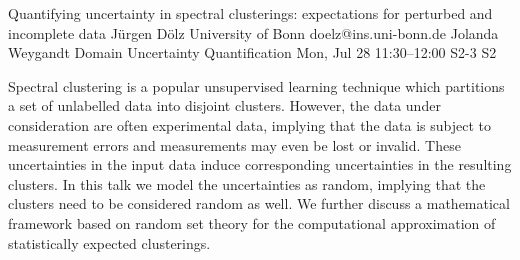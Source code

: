 \begin{talk}
\end{talk}

\begin{talk}
  {Quantifying uncertainty in spectral clusterings: expectations for perturbed and incomplete data}%
  {J\"urgen D\"olz}%
  {University of Bonn}%
  {doelz@ins.uni-bonn.de}%
  {Jolanda Weygandt}%
  {Domain Uncertainty Quantification}%
  {Mon, Jul 28 11:30–12:00}%
  {S2-3}%
  {S2}%
				
			
Spectral clustering is a popular unsupervised learning technique which partitions a set of unlabelled data into disjoint clusters. However, the data under consideration are often experimental data, implying that the data is subject to measurement errors and measurements may even be lost or invalid. These uncertainties in the input data induce corresponding uncertainties in the resulting clusters. In this talk we model the uncertainties as random, implying that the clusters need to be considered random as well. We further discuss a mathematical framework based on random set theory for the computational approximation of statistically expected clusterings.
\end{talk}

